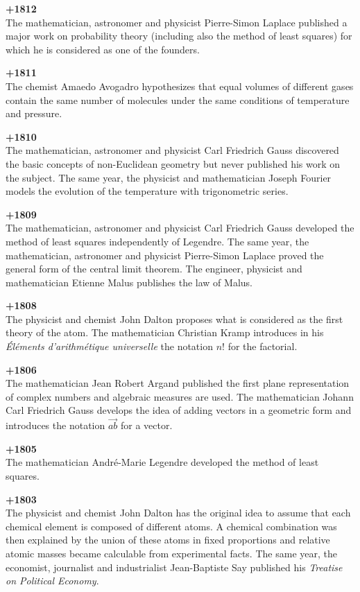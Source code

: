 \textbf{+1812}\\
The mathematician, astronomer and physicist Pierre-Simon Laplace published a major work on probability theory (including also the method of least squares) for which he is considered as one of the founders.

\textbf{+1811}\\
The chemist Amaedo Avogadro hypothesizes that equal volumes of different gases contain the same number of molecules under the same conditions of temperature and pressure.

\textbf{+1810}\\
The mathematician, astronomer and physicist Carl Friedrich Gauss discovered the basic concepts of non-Euclidean geometry but never published his work on the subject. The same year, the physicist and mathematician Joseph Fourier models the evolution of the temperature with trigonometric series.

\textbf{+1809}\\
The mathematician, astronomer and physicist Carl Friedrich Gauss developed the method of least squares independently of Legendre. The same year, the mathematician, astronomer and physicist Pierre-Simon Laplace proved the general form of the central limit theorem. The engineer, physicist and mathematician Etienne Malus publishes the law of Malus.

\textbf{+1808}\\
The physicist and chemist John Dalton proposes what is considered as the first theory of the atom. The mathematician Christian Kramp introduces in his \textit{Éléments d'arithmétique universelle} the notation $n!$ for the factorial.

\textbf{+1806}\\
The mathematician Jean Robert Argand published the first plane representation of complex numbers and algebraic measures are used. The mathematician Johann Carl Friedrich Gauss develops the idea of adding vectors in a geometric form and introduces the notation $\overrightarrow{ab}$ for a vector.

\textbf{+1805}\\
The mathematician André-Marie Legendre developed the method of least squares.

\textbf{+1803}\\
The physicist and chemist John Dalton has the original idea to assume that each chemical element is composed of different atoms. A chemical combination was then explained by the union of these atoms in fixed proportions and relative atomic masses became calculable from experimental facts. The same year, the economist, journalist and industrialist Jean-Baptiste Say published his \textit{Treatise on Political Economy}.

